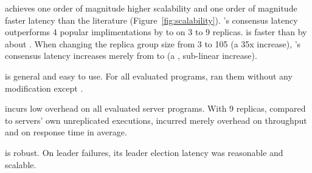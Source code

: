 \begin{tightenum}
\item \xxx achieves one order of magnitude higher scalability and one
order of magnitude faster latency than the literature 
(Figure~\ref{fig:scalability}). \xxx's consensus latency outperforms 4 
popular \paxos implimentations by \comptradlow to \comptradhigh on 3 to 
9 replicas. \xxx is faster than \dare by about \fasterDARE. When changing the 
replica group size from 3 to 105 (a 35x
increase), \xxx's consensus latency increases merely from \xxxlatencythree \us 
to
\xxxlatencyonezerofive \us (a \xxxscalability, sub-linear increase).

\item \xxx is general and easy to use. For all \nprog evaluated programs, \xxx 
ran them without any modification except \calvin.


\item \xxx incurs low overhead on all \nprog evaluated server programs.
With 9 replicas, compared to servers' own unreplicated executions, \xxx
incurred merely \tputoverhead overhead on throughput and \latencyoverhead on
response time in average.

\item \xxx is robust. On leader failures, its leader election
latency was reasonable and scalable.







\end{tightenum}

